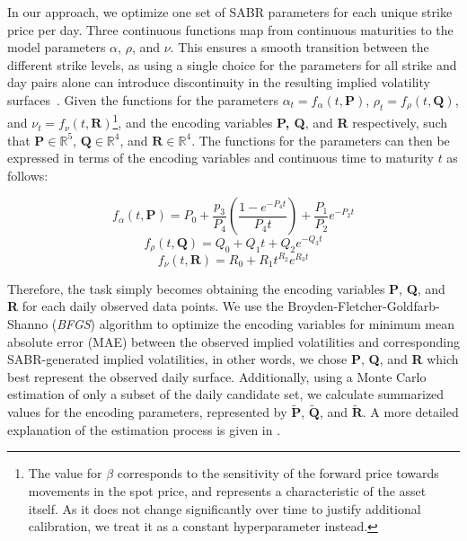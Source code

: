 In our approach, we optimize one set of SABR parameters for each unique strike price per day.
Three continuous functions map from continuous maturities to the model parameters $\alpha$, $\rho$, and $\nu$.
This ensures a smooth transition between the different strike levels,
as using a single choice for the parameters for all strike and day pairs alone can introduce discontinuity in the resulting implied volatility surfaces~\citep{Hagan2015, Kim2021}.
Given the functions for the parameters $\alpha_t = f_{\alpha}(t, \textbf{P})$, $\rho_t = f_{\rho}(t, \textbf{Q})$, and $\nu_t = f_{\nu}(t, \textbf{R})$\footnote{
    The value for $\beta$ corresponds to the sensitivity of the forward price towards movements in the spot price,
    and represents a characteristic of the asset itself.
    As it does not change significantly over time to justify additional calibration,
    we treat it as a constant hyperparameter instead.
},
and the encoding variables \textbf{P, Q}, and \textbf{R} respectively,
such that $\textbf{P} \in \mathbb{R}^{5}$, $\textbf{Q} \in \mathbb{R}^{4}$, and $\textbf{R} \in \mathbb{R}^{4}$.
The functions for the parameters can then be expressed in terms of the encoding variables and continuous time to maturity $t$ as follows:

\begin{equation*}
    \label{eq:f_alpha}
    f_{\alpha}(t, \textbf{P}) = P_0 + \frac{p_3}{P_4} \left( \frac{1 - e^{-P_4 t}}{P_4 t} \right) + \frac{P_1}{P_2} e^{-P_2 t}
\end{equation*}
\begin{equation*}
    \label{eq:f_rho}
    f_{\rho}(t, \textbf{Q}) = Q_0 + Q_1 t + Q_2 e^{-Q_3 t}
\end{equation*}
\begin{equation*}
    \label{eq:f_nu}
    f_{\nu}(t, \textbf{R}) = R_0 + R_1 t^{R_2} e^{R_3 t}
\end{equation*}

Therefore, the task simply becomes obtaining the encoding variables \textbf{P}, \textbf{Q}, and \textbf{R} for each daily observed data points.
We use the Broyden-Fletcher-Goldfarb-Shanno (\textit{BFGS}) algorithm to optimize the encoding variables for minimum mean absolute error (MAE)
between the observed implied volatilities and corresponding SABR-generated implied volatilities, in other words,
we chose \textbf{P}, \textbf{Q}, and \textbf{R} which best represent the observed daily surface.
Additionally, using a Monte Carlo estimation of only a subset of the daily candidate set,
we calculate summarized values for the encoding parameters, represented by $\widetilde{\textbf{P}}$, $\widetilde{\textbf{Q}}$, and $\widetilde{\textbf{R}}$.
A more detailed explanation of the estimation process is given in .


